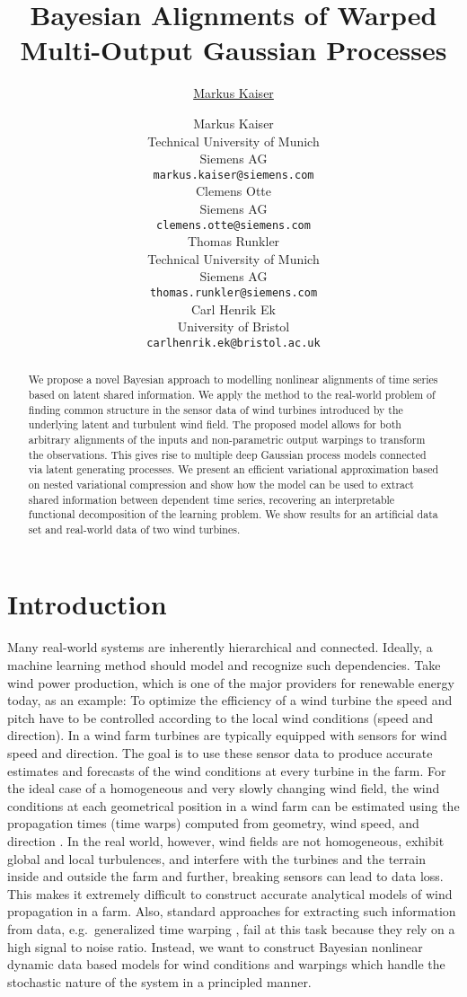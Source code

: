 \documentclass{article}
\title{Bayesian Alignments of Warped Multi-Output Gaussian Processes}
\author{\href{mailto:markus.kaiser@siemens.com}{Markus Kaiser}}
\author{
    Markus Kaiser\\
    Technical University of Munich\\
    Siemens AG\\
    \texttt{markus.kaiser@siemens.com}\\
    \And
    Clemens Otte\\
    Siemens AG\\
    \texttt{clemens.otte@siemens.com}\\
    \And
    Thomas Runkler\\
    Technical University of Munich\\
    Siemens AG\\
    \texttt{thomas.runkler@siemens.com}\\
    \And
    Carl Henrik Ek\\
    University of Bristol\\
    \texttt{carlhenrik.ek@bristol.ac.uk}\\
}
\begin{document}
\maketitle

\begin{abstract}
    We propose a novel Bayesian approach to modelling nonlinear alignments of time series based on latent shared information.
    We apply the method to the real-world problem of finding common structure in the sensor data of wind turbines introduced by the underlying latent and turbulent wind field.
    The proposed model allows for both arbitrary alignments of the inputs and non-parametric output warpings to transform the observations.
    This gives rise to multiple deep Gaussian process models connected via latent generating processes.
    We present an efficient variational approximation based on nested variational compression and show how the model can be used to extract shared information between dependent time series, recovering an interpretable functional decomposition of the learning problem.
    We show results for an artificial data set and real-world data of two wind turbines.
\end{abstract}


\section{Introduction}
Many real-world systems are inherently hierarchical and connected.
Ideally, a machine learning method should model and recognize such dependencies.
Take wind power production, which is one of the major providers for renewable energy today, as an example:
To optimize the efficiency of a wind turbine the speed and pitch have to be controlled according to the local wind conditions (speed and direction).
In a wind farm turbines are typically equipped with sensors for wind speed and direction.
The goal is to use these sensor data to produce accurate estimates and forecasts of the wind conditions at every turbine in the farm.
For the ideal case of a homogeneous and very slowly changing wind field, the wind conditions at each geometrical position in a wind farm can be estimated using the propagation times (time warps) computed from geometry, wind speed, and direction \parencite{soleimanzadeh_controller_2011,bitar_coordinated_2013,schepers_improved_2007}.
In the real world, however, wind fields are not homogeneous, exhibit global and local turbulences, and interfere with the turbines and the terrain inside and outside the farm and further, breaking sensors can lead to data loss.
This makes it extremely difficult to construct accurate analytical models of wind propagation in a farm.
Also, standard approaches for extracting such information from data, e.g.\ generalized time warping  \parencite{zhou_generalized_2012}, fail at this task because they rely on a high signal to noise ratio.
Instead, we want to construct Bayesian nonlinear dynamic data based models for wind conditions and warpings which handle the stochastic nature of the system in a principled manner.
\end{document}
